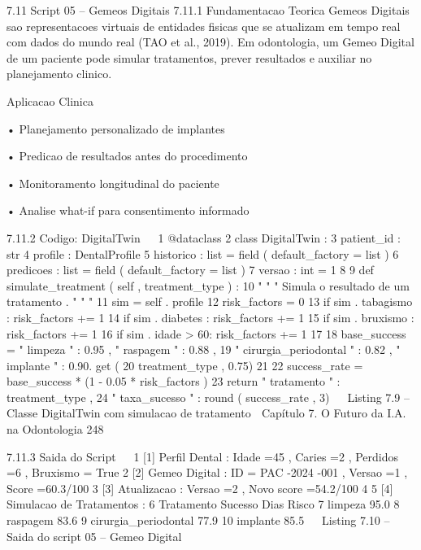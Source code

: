      7.11       Script 05 – Gemeos Digitais
     7.11.1     Fundamentacao Teorica
     Gemeos Digitais sao representacoes virtuais de entidades fisicas que se atualizam
     em tempo real com dados do mundo real (TAO et al., 2019). Em odontologia, um
     Gemeo Digital de um paciente pode simular tratamentos, prever resultados e auxiliar
     no planejamento clinico.

         Aplicacao Clinica

             • Planejamento personalizado de implantes

             • Predicao de resultados antes do procedimento

             • Monitoramento longitudinal do paciente

             • Analise what-if para consentimento informado


     7.11.2     Codigo: DigitalTwin
                                                                                          
 1 @dataclass
 2 class DigitalTwin :
 3     patient_id : str
 4     profile : DentalProfile
 5     historico : list = field ( default_factory = list )
 6     predicoes : list = field ( default_factory = list )
 7     versao : int = 1
 8
 9     def simulate_treatment ( self , treatment_type ) :
10         " " " Simula o resultado de um tratamento . " " "
11         sim = self . profile
12         risk_factors = 0
13         if sim . tabagismo : risk_factors += 1
14         if sim . diabetes : risk_factors += 1
15         if sim . bruxismo : risk_factors += 1
16         if sim . idade > 60: risk_factors += 1
17
18         base_success = { " limpeza " : 0.95 , " raspagem " : 0.88 ,
19                " cirurgia_periodontal " : 0.82 , " implante " : 0.90}. get (
20                treatment_type , 0.75)
21
22         success_rate = base_success * (1 - 0.05 * risk_factors )
23         return { " tratamento " : treatment_type ,
24                     " taxa_sucesso " : round ( success_rate , 3) }
                                                                                          
                   Listing 7.9 – Classe DigitalTwin com simulacao de tratamento
     Capítulo 7. O Futuro da I.A. na Odontologia                                            248


     7.11.3      Saida do Script
                                                                                                 
 1       [1] Perfil Dental : Idade =45 , Caries =2 , Perdidos =6 , Bruxismo = True
 2       [2] Gemeo Digital : ID = PAC -2024 -001 , Versao =1 , Score =60.3/100
 3       [3] Atualizacao : Versao =2 , Novo score =54.2/100
 4
 5       [4] Simulacao de Tratamentos :
 6                   Tratamento Sucesso Dias Risco
 7                       limpeza    95.0%
 8                      raspagem    83.6%
 9         cirurgia_periodontal    77.9%
10                      implante    85.5%
                                                                                                 
                          Listing 7.10 – Saida do script 05 – Gemeo Digital



